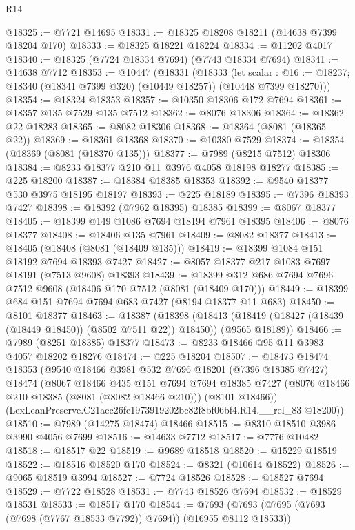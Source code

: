 \begin{lexlean}{R14}
\begin{coremodule}
@18325 := @7721 @14695
@18331 := @18325 @18208 @18211 (@14638 @7399 @18204 @170)
@18333 := @18325 @18221 @18224
@18334 := @11202 @4017
@18340 := @18325 (@7724 @18334 @7694) (@7743 @18334 @7694)
@18341 := @14638 @7712
@18353 := @10447
    (@18331
      (@18333
        (let scalar : @16 := @18237; @18340 (@18341 @7399 @320) (@10449 @18257))
        (@10448 @7399 @18270)))
@18354 := @18324 @18353
@18357 := @10350 @18306 @172 @7694
@18361 := @18357 @135 @7529 @135 @7512
@18362 := @8076 @18306
@18364 := @18362 @22 @18283
@18365 := @8082 @18306
@18368 := @18364 (@8081 (@18365 @22))
@18369 := @18361 @18368
@18370 := @10380 @7529
@18374 := @18354 (@18369 (@8081 (@18370 @135)))
@18377 := @7989 (@8215 @7512) @18306
@18384 := @8233 @18377 @210 @11 @3976 @4058 @18198 @18277
@18385 := @225 @18200
@18387 := @18384 @18385 @18353
@18392 := @9540 @18377 @530 @3975 @18195 @18197
@18393 := @225 @18189
@18395 := @7396 @18393 @7427
@18398 := @18392 (@7962 @18395) @18385
@18399 := @8067 @18377
@18405 := @18399 @149 @1086 @7694 @18194 @7961 @18395
@18406 := @8076 @18377
@18408 := @18406 @135 @7961
@18409 := @8082 @18377
@18413 := @18405 (@18408 (@8081 (@18409 @135)))
@18419 := @18399 @1084 @151 @18192 @7694 @18393 @7427
@18427 := @8057 @18377 @217 @1083 @7697 @18191 (@7513 @9608) @18393
@18439 := @18399 @312 @686 @7694 @7696 @7512 @9608 (@18406 @170 @7512 (@8081 (@18409 @170)))
@18449 := @18399 @684 @151 @7694 @7694 @683 @7427 (@8194 @18377 @11 @683)
@18450 := @8101 @18377
@18463 := @18387
    (@18398
      (@18413 (@18419 (@18427 (@18439 (@18449 @18450)) (@8502 @7511 @22)) @18450))
      (@9565 @18189))
@18466 := @7989 (@8251 @18385) @18377
@18473 := @8233 @18466 @95 @11 @3983 @4057 @18202 @18276
@18474 := @225 @18204
@18507 := @18473
    @18474
    @18353
    (@9540
      @18466
      @3981
      @532
      @7696
      @18201
      (@7396 @18385 @7427)
      @18474
      (@8067
        @18466
        @435
        @151
        @7694
        @7694
        @18385
        @7427
        (@8076 @18466 @210 @18385 (@8081 (@8082 @18466 @210)))
        (@8101 @18466))
      (LexLeanPreserve.C21aec26fe1973919202bc82f8bf06bf4.R14.__rel_83 @18200))
@18510 := @7989 (@14275 @18474) @18466
@18515 := @8310 @18510 @3986 @3990 @4056 @7699
@18516 := @14633 @7712
@18517 := @7776 @10482
@18518 := @18517 @22
@18519 := @9689 @18518
@18520 := @15229 @18519
@18522 := @18516 @18520 @170
@18524 := @8321 (@10614 @18522)
@18526 := @9065 @18519 @3994
@18527 := @7724 @18526
@18528 := @18527 @7694
@18529 := @7722 @18528
@18531 := @7743 @18526 @7694
@18532 := @18529 @18531
@18533 := @18517 @170
@18544 := @7693 (@7693 (@7695 (@7693 (@7698 (@7767 @18533 @7792)) @7694)) (@16955 @8112 @18533))

\end{coremodule}
\end{lexlean}
